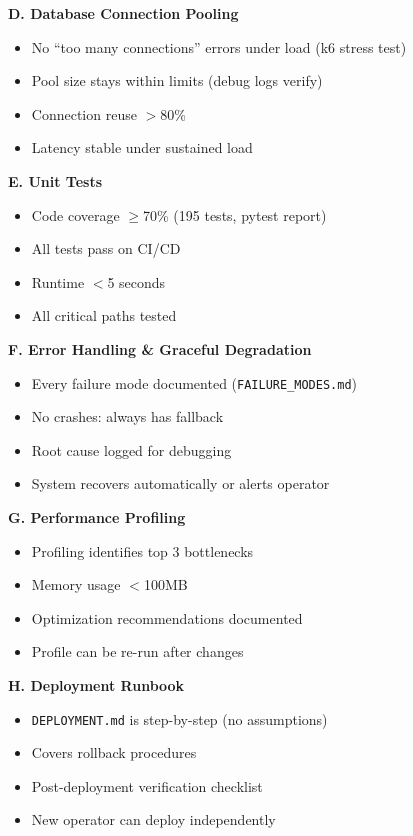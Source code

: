 \documentclass[11pt,a4paper]{article}
\begin{document}
\textbf{D. Database Connection Pooling}
\begin{itemize}[leftmargin=*]
    \item[$\checkmark$] No ``too many connections'' errors under load (k6 stress test)
    \item[$\checkmark$] Pool size stays within limits (debug logs verify)
    \item[$\checkmark$] Connection reuse $>$80\%
    \item[$\checkmark$] Latency stable under sustained load
\end{itemize}

\textbf{E. Unit Tests}
\begin{itemize}[leftmargin=*]
    \item[$\checkmark$] Code coverage $\geq$70\% (195 tests, pytest report)
    \item[$\checkmark$] All tests pass on CI/CD
    \item[$\checkmark$] Runtime $<$5 seconds
    \item[$\checkmark$] All critical paths tested
\end{itemize}

\textbf{F. Error Handling \& Graceful Degradation}
\begin{itemize}[leftmargin=*]
    \item[$\checkmark$] Every failure mode documented (\texttt{FAILURE\_MODES.md})
    \item[$\checkmark$] No crashes: always has fallback
    \item[$\checkmark$] Root cause logged for debugging
    \item[$\checkmark$] System recovers automatically or alerts operator
\end{itemize}

\textbf{G. Performance Profiling}
\begin{itemize}[leftmargin=*]
    \item[$\checkmark$] Profiling identifies top 3 bottlenecks
    \item[$\checkmark$] Memory usage $<$100MB
    \item[$\checkmark$] Optimization recommendations documented
    \item[$\checkmark$] Profile can be re-run after changes
\end{itemize}

\textbf{H. Deployment Runbook}
\begin{itemize}[leftmargin=*]
    \item[$\checkmark$] \texttt{DEPLOYMENT.md} is step-by-step (no assumptions)
    \item[$\checkmark$] Covers rollback procedures
    \item[$\checkmark$] Post-deployment verification checklist
    \item[$\checkmark$] New operator can deploy independently
\end{itemize}
\end{document}
